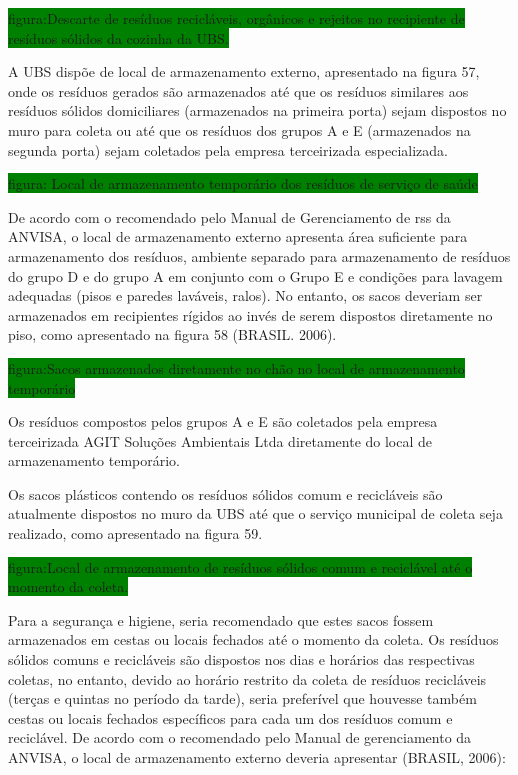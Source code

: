 	\colorbox{green}{figura:Descarte de resíduos recicláveis, orgânicos e rejeitos no recipiente de resíduos sólidos da cozinha da UBS.}
	
	A UBS dispõe de local de armazenamento externo, apresentado na figura 57, onde os resíduos gerados são armazenados até que os resíduos similares aos resíduos sólidos domiciliares (armazenados na primeira porta) sejam dispostos no muro para coleta ou até que os resíduos dos grupos A e E (armazenados na segunda porta) sejam coletados pela empresa terceirizada especializada.
	
	\colorbox{green}{figura: Local de armazenamento temporário dos resíduos de serviço de saúde}
	
	De acordo com o recomendado pelo Manual de Gerenciamento de \gls{rss} da ANVISA, o local de armazenamento externo apresenta área suficiente para armazenamento dos resíduos, ambiente separado para armazenamento de resíduos do grupo D e do grupo A em conjunto com o Grupo E e condições para lavagem adequadas (pisos e paredes laváveis, ralos). No entanto, os sacos deveriam ser armazenados em recipientes rígidos ao invés de serem dispostos diretamente no piso, como apresentado na figura 58 (BRASIL. 2006).
	
	\colorbox{green}{figura:Sacos armazenados diretamente no chão no local de armazenamento temporário}
	
	Os resíduos compostos pelos grupos A e E são coletados pela empresa terceirizada AGIT Soluções Ambientais Ltda diretamente do local de armazenamento temporário.
	
	Os sacos plásticos contendo os resíduos sólidos comum e recicláveis são atualmente dispostos no muro da UBS até que o serviço municipal de coleta seja realizado, como apresentado na figura 59.
	
	\colorbox{green}{figura:Local de armazenamento de resíduos sólidos comum e reciclável até o momento da coleta.}
	
	Para a segurança e higiene, seria recomendado que estes sacos fossem armazenados em cestas ou locais fechados até o momento da coleta. Os resíduos sólidos comuns e recicláveis são dispostos nos dias e horários das respectivas coletas, no entanto, devido ao horário restrito da coleta de resíduos recicláveis (terças e quintas no período da tarde), seria preferível que houvesse também cestas ou locais fechados específicos para cada um dos resíduos comum e reciclável.
	De acordo com o recomendado pelo Manual de gerenciamento da ANVISA, o local de armazenamento externo deveria apresentar (BRASIL, 2006):
	
